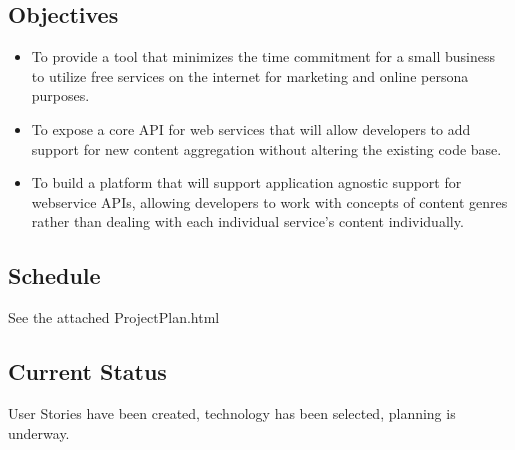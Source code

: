 \documentclass{article}
\begin{document}
\subsection*{Objectives}

\begin{itemize}
  \item To provide a tool that minimizes the time commitment for a small business to utilize free services on the internet for marketing and online persona purposes.
  \item To expose a core API for web services that will allow developers to add support for new content aggregation without altering the existing code base.
  \item To build a platform that will support application agnostic support for webservice APIs, allowing developers to work with concepts of content genres rather than dealing with each individual service's content individually.
\end{itemize}
\subsection*{Schedule}

See the attached ProjectPlan.html

\subsection*{Current Status}

User Stories have been created, technology has been selected, planning is underway.
\end{document}
